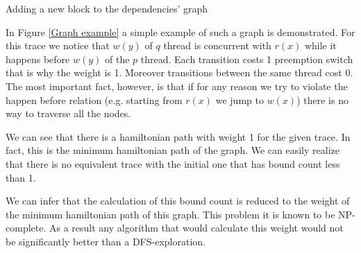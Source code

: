\begin{algorithm}[H]
    \caption{Adding a new block to the dependencies' graph}
    \label{Adding a new block to the dependencies graph}
\end{algorithm}



In Figure \ref{Graph example} a simple example of such a graph is demonstrated. For this trace we notice that $w(y)$ of
$q$ thread is concurrent with $r(x)$ while it happens before $w(y)$ of the $p$ thread. Each transition costs 1
preemption switch that is why the weight is 1. Moreover transitions between the same thread cost 0. The most important
fact, however, is that if for any reason we try to violate the happen before relation (e.g. starting from $r(x)$ we jump
to $w(x)$) there is no way to traverse all the nodes. 

We can see that there is a hamiltonian path with weight 1 for the given trace. In fact, this is the minimum hamiltonian
path of the graph. We can easily realize that there is no equivalent trace with the initial one that has bound count
less than 1. 

We can infer that the calculation of this bound count is reduced to the weight of the minimum hamiltonian path of this
graph. This problem it is known to be NP-complete. As a result any algorithm that would calculate this weight would not
be significantly better than a DFS-exploration. 

